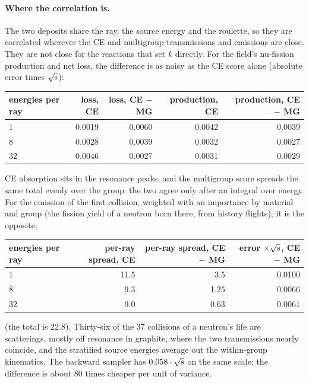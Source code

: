 \paragraph{Where the correlation is.} The two deposits share the ray, the source energy and the
roulette, so they are correlated wherever the CE and multigroup transmissions and emissions are
close. They are not close for the reactions that set $k$ directly. For the field's nu-fission
production and net loss, the difference is as noisy as the CE score alone (absolute error times
$\sqrt{\text s}$):
\begin{center}\small
\begin{tabular}{@{}lrrrr@{}}
\toprule
energies per ray & loss, CE & loss, CE $-$ MG & production, CE & production, CE $-$ MG\\
\midrule
1 & 0.0019 & 0.0060 & 0.0042 & 0.0039\\
8 & 0.0028 & 0.0039 & 0.0032 & 0.0027\\
32 & 0.0046 & 0.0027 & 0.0031 & 0.0029\\
\bottomrule
\end{tabular}
\end{center}
CE absorption sits in the resonance peaks, and the multigroup score spreads the same total evenly
over the group: the two agree only after an integral over energy. For the emission of the first
collision, weighted with an importance by material and group (the fission yield of a neutron born
there, from history flights), it is the opposite:
\begin{center}\small
\begin{tabular}{@{}lrrr@{}}
\toprule
energies per ray & per-ray spread, CE & per-ray spread, CE $-$ MG & error $\times\sqrt{\text s}$, CE $-$ MG\\
\midrule
1 & 11.5 & 3.5 & 0.0100\\
8 & 9.3 & 1.25 & 0.0066\\
32 & 9.0 & 0.63 & 0.0061\\
\bottomrule
\end{tabular}
\end{center}
(the total is 22.8). Thirty-six of the 37 collisions of a neutron's life are scatterings, mostly off
resonance in graphite, where the two transmissions nearly coincide, and the stratified source
energies average out the within-group kinematics. The backward sampler has
$0.058\cdot\sqrt{\text s}$ on the same scale: the difference is about 80 times cheaper per unit of
variance.

